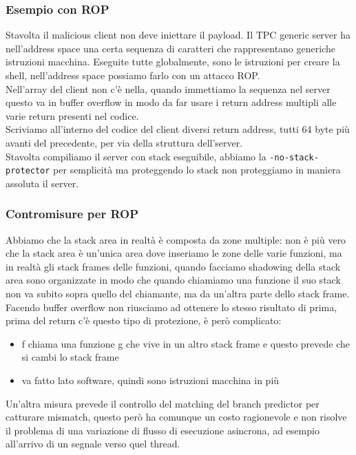 \documentclass[12pt, oneside]{extbook}
\begin{document}
\subsubsection*{Esempio con ROP}
Stavolta il malicious client non deve iniettare il payload. Il TPC generic server ha nell'address space una certa sequenza di caratteri che rappresentano generiche istruzioni macchina. Eseguite tutte globalmente, sono le istruzioni per creare la shell, nell'address space possiamo farlo con un attacco ROP.\\Nell'array del client non c'è nella, quando immettiamo la sequenza nel server questo va in buffer overflow in modo da far usare i return address multipli alle varie return presenti nel codice.\\Scriviamo all'interno del codice del client diversi return address, tutti 64 byte più avanti del precedente, per via della struttura dell'server.\\Stavolta compiliamo il server con stack eseguibile, abbiamo la \texttt{-no-stack-protector} per semplicità ma proteggendo lo stack non proteggiamo in maniera assoluta il server.
\subsubsection{Contromisure per ROP}
Abbiamo che la stack area in realtà è composta da zone multiple: non è più vero che la stack area è un'unica area dove inseriamo le zone delle varie funzioni, ma in realtà gli stack frames delle funzioni, quando facciamo shadowing della stack area sono organizzate in modo che quando chiamiamo una funzione il suo stack non va subito sopra quello del chiamante, ma da un'altra parte dello stack frame.\\Facendo buffer overflow non riusciamo ad ottenere lo stesso risultato di prima, prima del return c'è questo tipo di protezione, è però complicato:
\begin{itemize}
	\item f chiama una funzione g che vive in un altro stack frame e questo prevede che si cambi lo stack frame
	\item va fatto lato software, quindi sono istruzioni macchina in più
\end{itemize}
Un'altra misura prevede il controllo del matching del branch predictor per catturare mismatch, questo però ha comunque un costo ragionevole e non risolve il problema di una variazione di flusso di esecuzione asincrona, ad esempio all'arrivo di un segnale verso quel thread.
\end{document}
